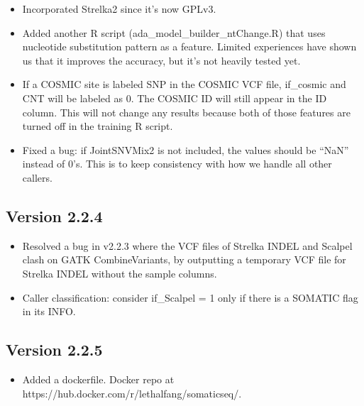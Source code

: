 \documentclass[10pt,letterpaper]{article}
\begin{document}
\begin{sloppypar}
\begin{itemize}

  \item
  Incorporated Strelka2 since it's now GPLv3.
  
  \item
  Added another R script (ada\_model\_builder\_ntChange.R) that uses nucleotide substitution pattern as a feature. Limited experiences have shown us that it improves the accuracy, but it's not heavily tested yet. 

  \item
  If a COSMIC site is labeled SNP in the COSMIC VCF file, if\_cosmic and CNT will be labeled as 0. The COSMIC ID will still appear in the ID column. This will not change any results because both of those features are turned off in the training R script.
  
  \item
  Fixed a bug: if JointSNVMix2 is not included, the values should be ``NaN'' instead of 0's. This is to keep consistency with how we handle all other callers.
  
\end{itemize}



\subsection{Version 2.2.4}

\begin{itemize}

  \item
  Resolved a bug in v2.2.3 where the VCF files of Strelka INDEL and Scalpel clash on GATK CombineVariants, by outputting a temporary VCF file for Strelka INDEL without the sample columns.
  
  \item
  Caller classification: consider if\_Scalpel = 1 only if there is a SOMATIC flag in its INFO. 

\end{itemize}


\subsection{Version 2.2.5}

\begin{itemize}
  
  \item
  Added a dockerfile. Docker repo at https://hub.docker.com/r/lethalfang/somaticseq/. 
  

\end{itemize}
\end{sloppypar}
\end{document}
